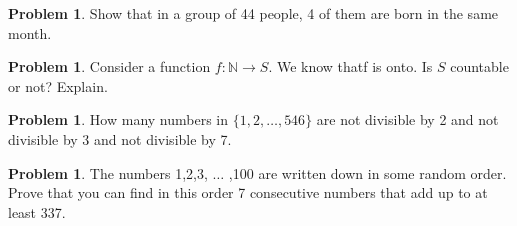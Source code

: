 \documentclass[10pt,leqno ]{article}
\theoremstyle{definition}
\newtheorem{problem}[theorem]{Problem}
\begin{document}
\begin{problem} Show that in a group of 44 people, 4 of them are born in the same month.
\\
\Large
\end{problem}
\newpage

\begin{problem} Consider a function $f: \mathbb{N} \to S$.  We know thatf is onto.  Is $S$ countable or not?  Explain.
\\
\Large
\end{problem}
\newpage

\begin{problem} How many numbers in $\{1,2, \dots ,546\}$ are not divisible by 2 and not divisible by 3 and not divisible by 7.
\\
\Large
\end{problem}
\newpage

\begin{problem} The numbers 1,2,3, $\dots$ ,100 are written down in some random order.  Prove that you can find in this order 7 consecutive numbers that add up to at least 337.
\\
\Large
\end{problem}
\newpage
\end{document}

